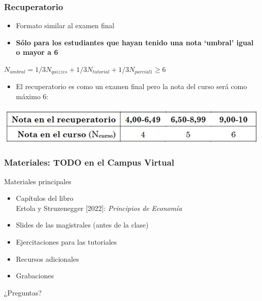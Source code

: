 \documentclass{beamer}
\begin{document}
\begin{frame}
\frametitle{Recuperatorio}
\begin{itemize}
    \item Formato similar al examen final \vspace{2mm}
    \item \textbf{Sólo para los estudiantes que hayan tenido una nota ‘umbral’ igual o mayor a 6}
\end{itemize}
    \begin{center}
        $N_{umbral}=1/3N_{quizzes}+1/3N_{tutorial}+1/3N_{parcial 1} \geq 6$
    \end{center}
    
\begin{itemize}
    \item El recuperatorio es como un examen final pero la nota del curso será como máximo 6:
\end{itemize}
\centering
\includegraphics[scale=0.6]{../Figures/notarecup.jpg}

\end{frame}

\begin{frame}
\frametitle{Materiales: TODO en el Campus Virtual}
Materiales principales
\begin{itemize}
    \item Capítulos del libro \vspace{2mm}  \\
    Ertola y Struzenegger [2022]:  \textit{Principios de Economía} \vspace{2mm} 
    \item Slides de las magistrales (antes de la clase) \vspace{2mm}
    \item Ejercitaciones para las tutoriales \vspace{2mm}
    \item Recursos adicionales \vspace{2mm}
    \item Grabaciones \vspace{2mm}
\end{itemize}
\end{frame}


\begin{frame}
\begin{center}
    \Huge ¿Preguntas?
\end{center}
\end{frame}
\end{document}
